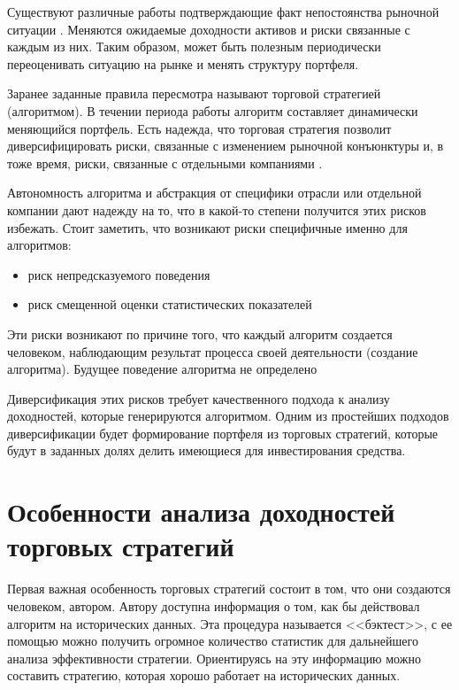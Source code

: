 Существуют различные работы подтверждающие факт непостоянства рыночной ситуации \citep{billio2003, koutmos2012}. Меняются ожидаемые доходности активов и риски связанные с каждым из них. Таким образом, может быть полезным периодически переоценивать ситуацию на рынке и менять структуру портфеля. 

Заранее заданные правила пересмотра называют торговой стратегией (алгоритмом). В течении периода работы алгоритм составляет динамически меняющийся портфель. Есть надежда, что торговая стратегия позволит диверсифицировать риски, связанные с изменением рыночной конъюнктуры и, в тоже время, риски, связанные с отдельными компаниями \citep{lorenz2008thesis}. 

Автономность алгоритма и абстракция от специфики отрасли или отдельной компании дают надежду на то, что в какой-то степени получится этих рисков избежать. Стоит заметить, что возникают риски специфичные именно для алгоритмов:
\begin{itemize}
	\item риск непредсказуемого поведения
	\item риск смещенной оценки статистических показателей
\end{itemize}
Эти риски возникают по причине того, что каждый алгоритм создается человеком, наблюдающим результат процесса своей деятельности (создание алгоритма). Будущее поведение алгоритма не определено

Диверсификация этих рисков требует качественного подхода к анализу доходностей, которые генерируются алгоритмом. Одним из простейших подходов диверсификации будет формирование портфеля из торговых стратегий, которые будут в заданных долях делить имеющиеся для инвестирования средства.

\section{Особенности анализа доходностей торговых стратегий}
Первая важная особенность торговых стратегий состоит в том, что они создаются человеком, автором. Автору доступна информация о том, как бы действовал алгоритм на исторических данных. Эта процедура называется <<бэктест>>, с ее помощью можно получить огромное количество статистик для дальнейшего анализа эффективности стратегии. Ориентируясь на эту информацию можно составить стратегию, которая хорошо работает на исторических данных. 

